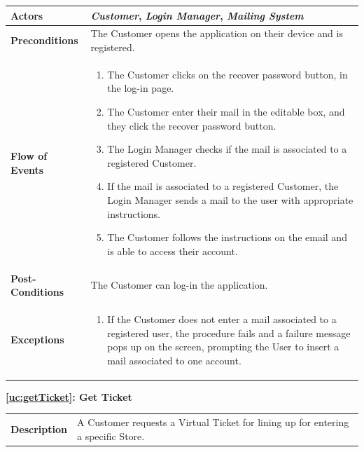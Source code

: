 \documentclass[a4paper, 12pt, oneside]{article}
\begin{document}
\begin{enumerate}[labelindent=20pt, label={UC.\arabic*}, itemindent=1em,leftmargin=!]
\begin{tabularx}{\linewidth}{| l | X |}
	\hline
	\textbf{Actors} & \textbf{\textit{Customer}}, \textit{\textbf{Login Manager}}, \textit{\textbf{Mailing System}} \\
	
	\hline
	\textbf{Preconditions} & The Customer opens the application on their device and is registered.\\
	
	\hline
	\textbf{Flow of Events} & \parbox{0.7\textwidth}{	
		\begin{enumerate}
			\item The Customer clicks on the recover password button, in the log-in page.
			\item The Customer enter their mail in the editable box, and they click the recover password button.
			\item The Login Manager checks if the mail is associated to a registered Customer.
			\item If the mail is associated to a registered Customer, the Login Manager sends a mail to the user with appropriate instructions.
			\item The Customer follows the instructions on the email and is able to access their account.
	\end{enumerate}}\\
	
	\hline
	\textbf{Post-Conditions} & The Customer can log-in the application.\\
	
	\hline
	\textbf{Exceptions} & \parbox{0.7\textwidth}{ \begin{enumerate}
			\item If the Customer does not enter a mail associated to a registered user, the procedure fails and a failure message pops up on the screen, prompting the User to insert a mail associated to one account.
		\end{enumerate}}\\

	\hline
	
\end{tabularx}

\begin{center}
{\textbf{\ref{uc:getTicket}: Get Ticket}}
\end{center}
\begin{tabularx}{\linewidth}{| l | X |}
	
	\hline
	\textbf{Description} & A Customer requests a Virtual Ticket for lining up for entering a specific Store.\\
	

\end{tabularx}
\end{enumerate}
\end{document}
